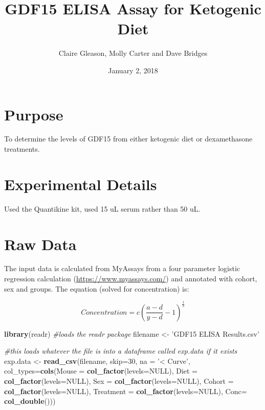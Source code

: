 \documentclass[]{article}
\title{GDF15 ELISA Assay for Ketogenic Diet}
\author{Claire Gleason, Molly Carter and Dave Bridges}
\date{January 2, 2018}
\newenvironment{Shaded}{\begin{snugshade}}{\end{snugshade}}
\newcommand{\CommentTok}[1]{\textcolor[rgb]{0.56,0.35,0.01}{\textit{#1}}}
\newcommand{\DataTypeTok}[1]{\textcolor[rgb]{0.13,0.29,0.53}{#1}}
\newcommand{\DecValTok}[1]{\textcolor[rgb]{0.00,0.00,0.81}{#1}}
\newcommand{\KeywordTok}[1]{\textcolor[rgb]{0.13,0.29,0.53}{\textbf{#1}}}
\newcommand{\NormalTok}[1]{#1}
\newcommand{\OtherTok}[1]{\textcolor[rgb]{0.56,0.35,0.01}{#1}}
\newcommand{\StringTok}[1]{\textcolor[rgb]{0.31,0.60,0.02}{#1}}
\begin{document}
\maketitle

{
\setcounter{tocdepth}{2}
\tableofcontents
}
\hypertarget{purpose}{%
\section{Purpose}\label{purpose}}

To determine the levels of GDF15 from either ketogenic diet or
dexamethasone treatments.

\hypertarget{experimental-details}{%
\section{Experimental Details}\label{experimental-details}}

Used the Quantikine kit, used 15 uL serum rather than 50 uL.

\hypertarget{raw-data}{%
\section{Raw Data}\label{raw-data}}

The input data is calculated from MyAssays from a four parameter
logistic regression calculation (\url{https://www.myassays.com/}) and
annotated with cohort, sex and groups. The equation (solved for
concentration) is:

\[ Concentration = c\left ( \frac{a-d}{y-d} -1 \right )^{\frac{1}{b}} \]

\begin{Shaded}
\begin{Highlighting}[]
\KeywordTok{library}\NormalTok{(readr) }\CommentTok{#loads the readr package}
\NormalTok{filename <-}\StringTok{ 'GDF15 ELISA Results.csv'} 

\CommentTok{#this loads whatever the file is into a dataframe called exp.data if it exists}
\NormalTok{exp.data <-}\StringTok{ }\KeywordTok{read_csv}\NormalTok{(filename, }\DataTypeTok{skip=}\DecValTok{30}\NormalTok{,}
                       \DataTypeTok{na =} \StringTok{'< Curve'}\NormalTok{,}
                       \DataTypeTok{col_types=}\KeywordTok{cols}\NormalTok{(}\DataTypeTok{Mouse =} \KeywordTok{col_factor}\NormalTok{(}\DataTypeTok{levels=}\OtherTok{NULL}\NormalTok{),}
                                      \DataTypeTok{Diet =} \KeywordTok{col_factor}\NormalTok{(}\DataTypeTok{levels=}\OtherTok{NULL}\NormalTok{),}
                                      \DataTypeTok{Sex =} \KeywordTok{col_factor}\NormalTok{(}\DataTypeTok{levels=}\OtherTok{NULL}\NormalTok{),}
                                      \DataTypeTok{Cohort =} \KeywordTok{col_factor}\NormalTok{(}\DataTypeTok{levels=}\OtherTok{NULL}\NormalTok{),}
                                      \DataTypeTok{Treatment =} \KeywordTok{col_factor}\NormalTok{(}\DataTypeTok{levels=}\OtherTok{NULL}\NormalTok{),}
                                      \DataTypeTok{Conc=} \KeywordTok{col_double}\NormalTok{()))}
\end{Highlighting}
\end{Shaded}
\end{document}

